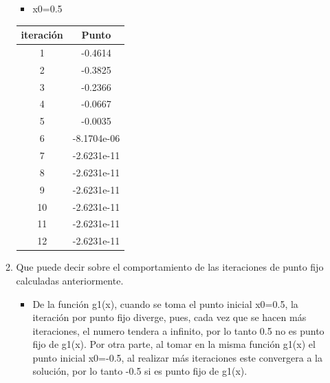 \documentclass{udparticle}
\begin{document}
\begin{enumerate}
\begin{enumerate}
\begin{table}[H]
\begin{tabular} { |c|c|}
        \end{tabular}
        
    \end{table}
     \begin{itemize}
\item x0=0.5
\end{itemize}
\begin{table}[H]
    \centering
        \begin{tabular} { |c|c|}
        \hline
        iteración  &  Punto\\
        \hline
        1 &  -0.4614      \\
         \hline
        2 &   -0.3825   \\
         \hline
        3 &  -0.2366 \\
         \hline
        4 &  -0.0667    \\
         \hline
        5 &   -0.0035 \\
         \hline
        6 & -8.1704e-06     \\
         \hline
        7 &     -2.6231e-11 \\
         \hline
        8 &   -2.6231e-11   \\
         \hline
        9 &        -2.6231e-11 \\
         \hline
        10 &     -2.6231e-11    \\
         \hline
        11 &    -2.6231e-11 \\
         \hline
        12 &    -2.6231e-11  \\
        \hline
        \end{tabular}
    \end{table}
\vspace{3cm}
\item Que puede decir sobre el comportamiento de las iteraciones de punto fijo calculadas anteriormente.
\begin{itemize}

\item De la función g1(x), cuando se toma el punto inicial x0=0.5, la iteración por punto fijo diverge, pues, cada vez que se hacen más iteraciones, el numero tendera a infinito, por lo tanto 0.5 no es punto fijo de g1(x).
Por otra parte, al tomar en la misma función g1(x) el punto inicial x0=-0.5, al realizar más iteraciones este convergera a la solución, por lo tanto -0.5 si es punto fijo de g1(x).


\end{itemize}
\end{enumerate}
\end{enumerate}
\end{document}
